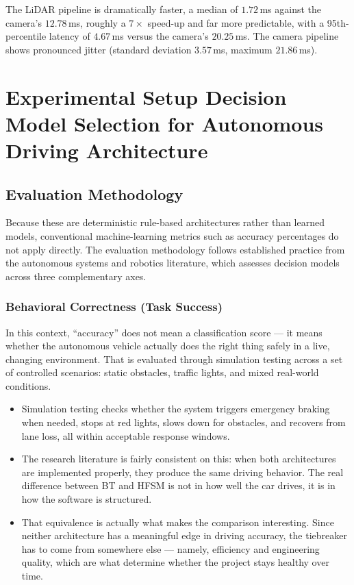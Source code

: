 \documentclass[12pt, a4paper]{report}
\begin{document}
The LiDAR pipeline is dramatically faster, a median of $1.72$\,ms against the
camera's $12.78$\,ms, roughly a $7\times$ speed-up and far more predictable,
with a 95th-percentile latency of $4.67$\,ms versus the camera's $20.25$\,ms.
The camera pipeline shows pronounced jitter (standard deviation $3.57$\,ms,
maximum $21.86$\,ms). 

\section{Experimental Setup Decision Model Selection for Autonomous Driving Architecture}

\subsection{Evaluation Methodology}

Because these are deterministic rule-based architectures rather than learned models, conventional machine-learning metrics such as accuracy percentages do not apply directly. The evaluation methodology follows established practice from the autonomous systems and robotics literature, which assesses decision models across three complementary axes.

\subsubsection{Behavioral Correctness (Task Success)}

In this context, ``accuracy'' does not mean a classification score --- it means whether the autonomous vehicle actually does the right thing safely in a live, changing environment. That is evaluated through simulation testing across a set of controlled scenarios: static obstacles, traffic lights, and mixed real-world conditions.

\begin{itemize}
    \item Simulation testing checks whether the system triggers emergency braking when needed, stops at red lights, slows down for obstacles, and recovers from lane loss, all within acceptable response windows.
    \item The research literature is fairly consistent on this: when both architectures are implemented properly, they produce the same driving behavior. The real difference between BT and HFSM is not in how well the car drives, it is in how the software is structured.
    \item That equivalence is actually what makes the comparison interesting. Since neither architecture has a meaningful edge in driving accuracy, the tiebreaker has to come from somewhere else --- namely, efficiency and engineering quality, which are what determine whether the project stays healthy over time.
\end{itemize}
\end{document}

